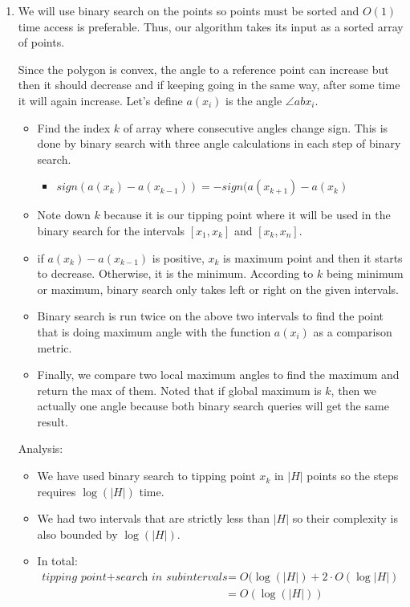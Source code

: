 \begin{enumerate}
  \item
  We will use binary search on the points so points must be sorted and $O(1)$ time access is preferable. Thus, our algorithm takes its input as a sorted array of points. 

  Since the polygon is convex, the angle to a reference point can increase but then it should decrease and if keeping going in the same way, after some time it will again increase. Let's define $a(x_i)$ is the angle $\angle{abx_i}$.

  \begin{itemize}
    \item Find the index $k$ of array where consecutive angles change sign. This is done by binary search with three angle calculations in each step of binary search.
    \begin{itemize}
      \item $sign(a(x_k) - a(x_{k-1})) = - sign(a(x_{k+1}) - a(x_k)$
    \end{itemize}
    \item Note down $k$ because it is our tipping point where it will be used in the binary search for the intervals $[x_1, x_k]$ and $[x_k, x_n]$.
    \item if $a(x_k) - a(x_{k-1})$ is positive, $x_k$ is maximum point and then it starts to decrease. Otherwise, it is the minimum. According to $k$ being minimum or maximum, binary search only takes left or right on the given intervals.
    \item Binary search is run twice on the above two intervals to find the point that is doing maximum angle with the function $a(x_i)$ as a comparison metric.
    \item Finally, we compare two local maximum angles to find the maximum and return the max of them. Noted that if global maximum is $k$, then we actually one angle because both binary search queries will get the same result.
  \end{itemize}

Analysis:
  \begin{itemize}
    \item We have used binary search to tipping point $x_k$ in $|H|$ points so the steps requires $\log(|H|)$ time.
    \item We had two intervals that are strictly less than $|H|$ so their complexity is also bounded by $\log(|H|)$.
    \item In total:
    \begin{align*}
      \textit{tipping point} + \textit{search in subintervals} &= O(\log(|H|) + 2 \cdot O(\log|H|) \\
      &= O(\log(|H|))   
    \end{align*}    
  \end{itemize}


\end{enumerate}
